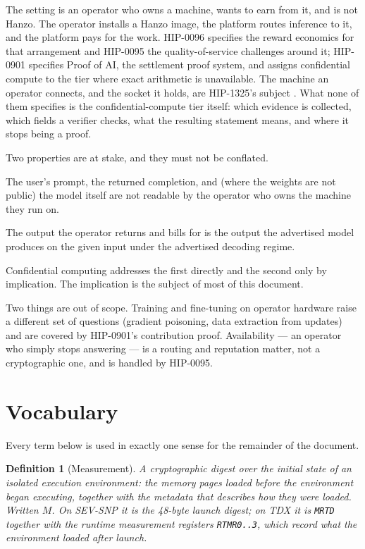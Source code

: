 \documentclass[11pt]{article}
\newcommand{\code}[1]{\texttt{#1}}
\newtheorem{definition}{Definition}
\begin{document}
The setting is an operator who owns a machine, wants to earn from it, and is not Hanzo. The
operator installs a Hanzo image, the platform routes inference to it, and the platform pays for the
work. HIP-0096 \cite{hip0096} specifies the reward economics for that arrangement and HIP-0095
\cite{hip0095} the quality-of-service challenges around it; HIP-0901 \cite{hip0901} specifies Proof
of AI, the settlement proof system, and assigns confidential compute to the tier where exact
arithmetic is unavailable. The machine an operator connects, and the socket it holds, are HIP-1325's
subject \cite{hip1325}. What
none of them specifies is the confidential-compute tier itself: which evidence is collected, which
fields a verifier checks, what the resulting statement means, and where it stops being a proof.

Two properties are at stake, and they must not be conflated.

\begin{description}[leftmargin=1.2em,itemsep=3pt]
\item[Confidentiality.] The user's prompt, the returned completion, and (where the weights are not
public) the model itself are not readable by the operator who owns the machine they run on.
\item[Execution integrity.] The output the operator returns and bills for is the output the
advertised model produces on the given input under the advertised decoding regime.
\end{description}

Confidential computing addresses the first directly and the second only by implication. The
implication is the subject of most of this document.

Two things are out of scope. Training and fine-tuning on operator hardware raise a different set of
questions (gradient poisoning, data extraction from updates) and are covered by HIP-0901's
contribution proof. Availability --- an operator who simply stops answering --- is a routing and
reputation matter, not a cryptographic one, and is handled by HIP-0095.

\section{Vocabulary}

Every term below is used in exactly one sense for the remainder of the document.

\begin{definition}[Measurement]
A cryptographic digest over the initial state of an isolated execution environment: the memory pages
loaded before the environment began executing, together with the metadata that describes how they
were loaded. Written $M$. On SEV-SNP it is the 48-byte launch digest; on TDX it is \code{MRTD}
together with the runtime measurement registers \code{RTMR0..3}, which record what the environment
loaded after launch.
\end{definition}
\end{document}
